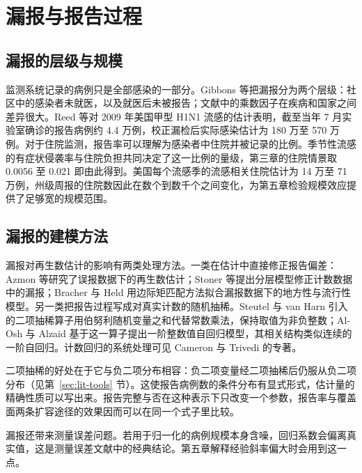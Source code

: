 \section{漏报与报告过程}
\label{sec:lit-reporting}

\subsection{漏报的层级与规模}

监测系统记录的病例只是全部感染的一部分。Gibbons 等把漏报分为两个层级：社区中的感染者未就医，以及就医后未被报告；文献中的乘数因子在疾病和国家之间差异很大\citep{gibbons2014measuring}。Reed 等对 2009 年美国甲型 H1N1 流感的估计表明，截至当年 7 月实验室确诊的报告病例约 4.4 万例，校正漏检后实际感染估计为 180 万至 570 万例\citep{reed2009estimates}。对于住院监测，报告率可以理解为感染者中住院并被记录的比例。季节性流感的有症状侵袭率\citep{tokars2018seasonal}与住院负担\citep{zhou2012hospitalizations, rolfes2018annual}共同决定了这一比例的量级，第三章的住院情景取 0.0056 至 0.021 即由此得到。美国每个流感季的流感相关住院估计为 14 万至 71 万例\citep{rolfes2018annual}，州级周报的住院数因此在数个到数千个之间变化，为第五章检验规模效应提供了足够宽的规模范围\citep{cdc2026nhsn}。

\subsection{漏报的建模方法}

漏报对再生数估计的影响有两类处理方法。一类在估计中直接修正报告偏差：Azmon 等研究了误报数据下的再生数估计\citep{azmon2014estimating}；Stoner 等提出分层模型修正计数数据中的漏报\citep{stoner2019hierarchical}；Bracher 与 Held 用边际矩匹配方法拟合漏报数据下的地方性与流行性模型\citep{bracher2021marginal}。另一类把报告过程写成对真实计数的随机抽稀。Steutel 与 van Harn 引入的二项抽稀算子用伯努利随机变量之和代替常数乘法，保持取值为非负整数\citep{steutel1979discrete}；Al-Osh 与 Alzaid 基于这一算子提出一阶整数值自回归模型，其相关结构类似连续的一阶自回归\citep{alosh1987first}。计数回归的系统处理可见 Cameron 与 Trivedi 的专著\citep{cameron2013regression}。

二项抽稀的好处在于它与负二项分布相容：负二项变量经二项抽稀后仍服从负二项分布（见第~\ref{sec:lit-tools} 节）。这使报告病例数的条件分布有显式形式，估计量的精确性质可以写出来。报告完整与否在这种表示下只改变一个参数，报告率与覆盖面两条扩容途径的效果因而可以在同一个式子里比较。

漏报还带来测量误差问题。若用于归一化的病例规模本身含噪，回归系数会偏离真实值，这是测量误差文献中的经典结论\citep{fuller1987measurement, carroll2006measurement}。第五章解释经验斜率偏大时会用到这一点。

